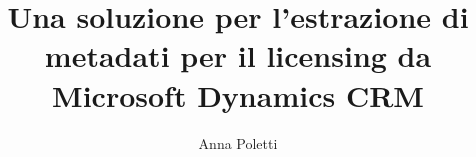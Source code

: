 \title{Una soluzione per l'estrazione di metadati per il licensing da Microsoft Dynamics CRM}
\author{Anna Poletti}




